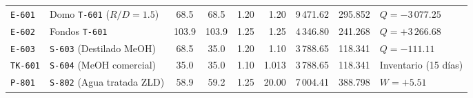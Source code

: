 \documentclass[10pt,letterpaper]{article}
\begin{document}
\begin{landscape}
\begin{xltabular}{\linewidth}{l >{\raggedright\arraybackslash}p{2.9cm} c c r r r r >{\raggedleft\arraybackslash}X}
\texttt{E-601} & Domo \texttt{T-601} ($R/D = 1.5$) & 68.5 & 68.5 & 1.20 & 1.20 & 9\,471.62 & 295.852 & $Q = -3\,077.25$ \\
\texttt{E-602} & Fondos \texttt{T-601} & 103.9 & 103.9 & 1.25 & 1.25 & 4\,346.80 & 241.268 & $Q = +3\,266.68$ \\
\texttt{E-603} & \texttt{S-603} (Destilado MeOH) & 68.5 & 35.0 & 1.20 & 1.10 & 3\,788.65 & 118.341 & $Q = -111.11$ \\
\texttt{TK-601} & \texttt{S-604} (MeOH comercial) & 35.0 & 35.0 & 1.10 & 1.013 & 3\,788.65 & 118.341 & Inventario (15 días) \\
\texttt{P-801} & \texttt{S-802} (Agua tratada ZLD) & 58.9 & 59.2 & 1.25 & 20.00 & 7\,004.41 & 388.798 & $W = +5.51$ \\
\end{xltabular}
\end{landscape}
\end{document}
